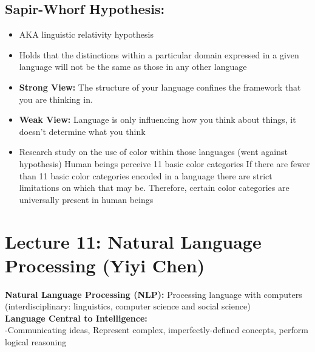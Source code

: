 \documentclass{article}
\begin{document}
\subsection{Sapir-Whorf Hypothesis:}
\begin{itemize}
    \item AKA linguistic relativity hypothesis
    \item Holds that the distinctions within a particular domain expressed in a given language will not be the same as those in any other language
    
    \item \textbf{Strong View:} The structure of your language confines the framework that you are thinking in. 
    \item \textbf{Weak View:} Language is only influencing how you think about things, it doesn't determine what you think
    
    \item Research study on the use of color within those languages (went against hypothesis) 
        \subitem Human beings perceive 11 basic color categories
        \subitem If there are fewer than 11 basic color categories encoded in a language there are strict limitations on which that may be. 
        \subitem Therefore, certain color categories are universally present in human beings
\end{itemize}

\newpage
\section{Lecture 11: Natural Language Processing (Yiyi Chen)}

\textbf{Natural Language Processing (NLP):} Processing language with computers (interdisciplinary: linguistics, computer science and social science) \\

\noindent \textbf{Language Central to Intelligence:} \\
    -Communicating ideas, Represent complex, imperfectly-defined concepts, perform logical reasoning \\
\end{document}
